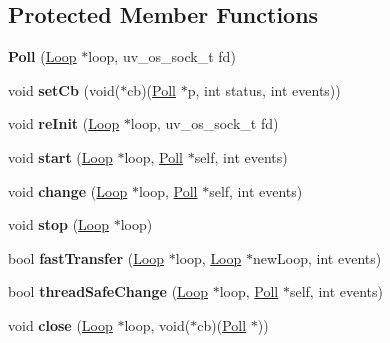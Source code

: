 \subsection*{Protected Member Functions}
\begin{DoxyCompactItemize}
\item 
\mbox{\label{struct_poll_aade8fc2874809b30916f01da7f25e311}} 
{\bfseries Poll} (\mbox{\hyperlink{struct_loop}{Loop}} $\ast$loop, uv\+\_\+os\+\_\+sock\+\_\+t fd)
\item 
\mbox{\label{struct_poll_a3ddbb71196969fe413d3cf1839614007}} 
void {\bfseries set\+Cb} (void($\ast$cb)(\mbox{\hyperlink{struct_poll}{Poll}} $\ast$p, int status, int events))
\item 
\mbox{\label{struct_poll_aee1dc4611ed13e45815e9f6f5e9c8de6}} 
void {\bfseries re\+Init} (\mbox{\hyperlink{struct_loop}{Loop}} $\ast$loop, uv\+\_\+os\+\_\+sock\+\_\+t fd)
\item 
\mbox{\label{struct_poll_a05f8cda6c9c0cc93a72d839ffaf0bc0f}} 
void {\bfseries start} (\mbox{\hyperlink{struct_loop}{Loop}} $\ast$loop, \mbox{\hyperlink{struct_poll}{Poll}} $\ast$self, int events)
\item 
\mbox{\label{struct_poll_a2f7e7dff4de0c28ab149e06c5bcc4a68}} 
void {\bfseries change} (\mbox{\hyperlink{struct_loop}{Loop}} $\ast$loop, \mbox{\hyperlink{struct_poll}{Poll}} $\ast$self, int events)
\item 
\mbox{\label{struct_poll_af77fdd073ba25acdff5455fe04d4377b}} 
void {\bfseries stop} (\mbox{\hyperlink{struct_loop}{Loop}} $\ast$loop)
\item 
\mbox{\label{struct_poll_af924777c7d22e9b178f1e466e61d18ba}} 
bool {\bfseries fast\+Transfer} (\mbox{\hyperlink{struct_loop}{Loop}} $\ast$loop, \mbox{\hyperlink{struct_loop}{Loop}} $\ast$new\+Loop, int events)
\item 
\mbox{\label{struct_poll_a5ba94f676bdf1f2dc2bbdab1b222aad5}} 
bool {\bfseries thread\+Safe\+Change} (\mbox{\hyperlink{struct_loop}{Loop}} $\ast$loop, \mbox{\hyperlink{struct_poll}{Poll}} $\ast$self, int events)
\item 
\mbox{\label{struct_poll_ac300fe377eb859743d91014acedd3168}} 
void {\bfseries close} (\mbox{\hyperlink{struct_loop}{Loop}} $\ast$loop, void($\ast$cb)(\mbox{\hyperlink{struct_poll}{Poll}} $\ast$))
\end{DoxyCompactItemize}
